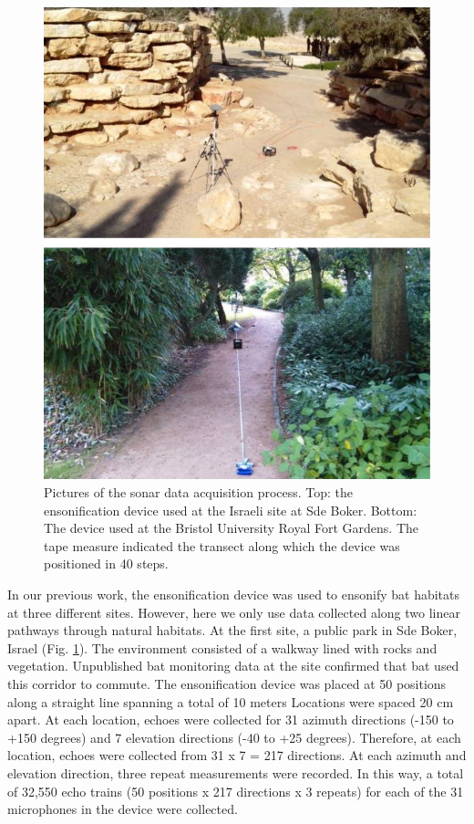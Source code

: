 \documentclass[preprint,5p]{elsarticle}
\begin{document}
\begin{figure}[tb]
	\centering
	\includegraphics[width=1\linewidth]{figures/datacollection}
	\caption{Pictures of the sonar data acquisition process. Top: the ensonification device used at the Israeli site at Sde Boker. Bottom: The device used at the Bristol University Royal Fort Gardens. The tape measure indicated the transect along which the device was positioned in 40 steps.}
	\label{fig:datacollection}
\end{figure}

In our previous work, the ensonification device was used to ensonify bat habitats at three different sites. However, here we only use data collected along two linear pathways through natural habitats. At the first site, a public park in Sde Boker, Israel (Fig. \ref{fig:datacollection}). The environment consisted of a walkway lined with rocks and vegetation. Unpublished bat monitoring data at the site confirmed that bat used this corridor to commute. The ensonification device was placed at 50 positions along a straight line spanning a total of 10 meters Locations were spaced 20 cm apart. At each location, echoes were collected for 31 azimuth directions (-150 to +150 degrees) and 7 elevation directions (-40 to +25 degrees). Therefore, at each location, echoes were collected from 31 x 7 = 217 directions. At each azimuth and elevation direction, three repeat measurements were recorded. In this way, a total of 32,550 echo trains (50 positions x 217 directions x 3 repeats) for each of the 31 microphones in the device were collected.
\end{document}
